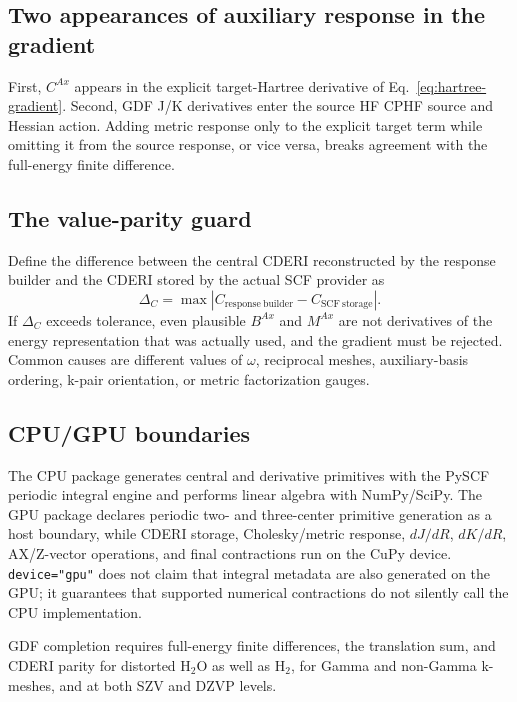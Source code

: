 \subsection{Two appearances of auxiliary response in the gradient}

First, $C^{Ax}$ appears in the explicit target-Hartree derivative of
Eq.~\eqref{eq:hartree-gradient}.  Second, GDF J/K derivatives enter the source
HF CPHF source and Hessian action.  Adding metric response only to the explicit
target term while omitting it from the source response, or vice versa, breaks
agreement with the full-energy finite difference.

\subsection{The value-parity guard}

Define the difference between the central CDERI reconstructed by the response
builder and the CDERI stored by the actual SCF provider as
\begin{equation}
  \Delta_C=\max|C_{\mathrm{response\ builder}}-C_{\mathrm{SCF\ storage}}|.
  \label{eq:gdf-cderi-parity}
\end{equation}
If $\Delta_C$ exceeds tolerance, even plausible $B^{Ax}$ and $M^{Ax}$ are not
derivatives of the energy representation that was actually used, and the
gradient must be rejected.  Common causes are different values of $\omega$,
reciprocal meshes, auxiliary-basis ordering, k-pair orientation, or metric
factorization gauges.

\subsection{CPU/GPU boundaries}

The CPU package generates central and derivative primitives with the PySCF
periodic integral engine and performs linear algebra with NumPy/SciPy.  The GPU
package declares periodic two- and three-center primitive generation as a host
boundary, while CDERI storage, Cholesky/metric response, $dJ/dR$, $dK/dR$,
AX/Z-vector operations, and final contractions run on the CuPy device.
\texttt{device="gpu"} does not claim that integral metadata are also generated
on the GPU; it guarantees that supported numerical contractions do not
silently call the CPU implementation.

GDF completion requires full-energy finite differences, the translation sum,
and CDERI parity for distorted H$_2$O as well as H$_2$, for Gamma and
non-Gamma k-meshes, and at both SZV and DZVP levels.
